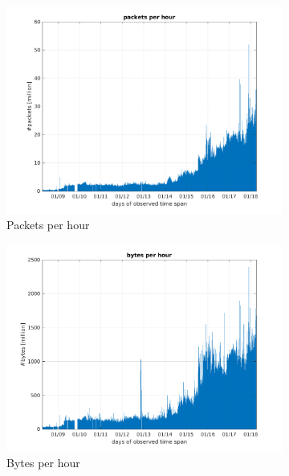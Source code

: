\documentclass{article}
\begin{document}
\begin{figure}[H]
    \begin{subfigure}{.5\textwidth}
        \centering
        \includegraphics[width=\textwidth]{../exercise-3/plots/rep_10_1}
        \caption{Packets per hour}
    \end{subfigure}
    \begin{subfigure}{.5\textwidth}
        \centering
        \includegraphics[width=\textwidth]{../exercise-3/plots/rep_10_2}
        \caption{Bytes per hour}
    \end{subfigure}
    \begin{subfigure}{.5\textwidth}
        \centering

\end{subfigure}
\end{figure}
\end{document}
